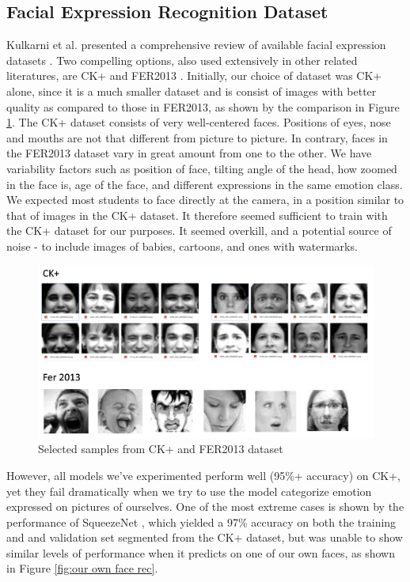 \documentclass{article}
\begin{document}
\subsection{Facial Expression Recognition Dataset}
Kulkarni et al. presented a comprehensive review of available facial expression datasets \cite{kulkarni_2009}. Two compelling options, also used extensively in other related literatures, are CK+ and FER2013 \cite{ck+}. Initially, our choice of dataset was CK+ alone, since it is a much smaller dataset and is consist of images with better quality as compared to those in FER2013, as shown by the comparison in Figure \ref{fig:dataset comparison}. The CK+ dataset consists of very well-centered faces. Positions of eyes, nose and mouths are not that different from picture to picture. In contrary, faces in the FER2013 dataset vary in great amount from one to the other. We have variability factors such as position of face, tilting angle of the head, how zoomed in the face is, age of the face, and different expressions in the same emotion class. We expected most students to face directly at the camera, in a position similar to that of images in the CK+ dataset. It therefore seemed sufficient to train with the CK+ dataset for our purposes. It seemed overkill, and a potential source of noise - to include images of babies, cartoons, and ones with watermarks.
\begin{figure}[]
    \centering
    \includegraphics[width=\textwidth]{figs/ckfer.png}
    \caption{Selected samples from CK+ and FER2013 dataset}
    \label{fig:dataset comparison}
\end{figure}
However, all models we've experimented perform well (95\%+ accuracy) on CK+, yet they fail dramatically when we try to use the model categorize emotion expressed on pictures of ourselves. One of the most extreme cases is shown by the performance of SqueezeNet \cite{squeezenet}, which yielded a 97\% accuracy on both the training and and validation set segmented from the CK+ dataset, but was unable to show similar levels of performance when it predicts on one of our own faces, as shown in Figure \ref{fig:our own face rec}.
\end{document}
